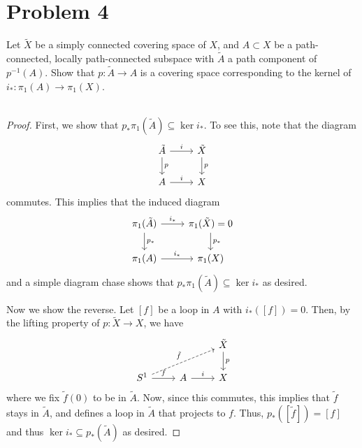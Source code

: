 \documentclass[fontsize=11pt]{scrartcl} %
\numberwithin{equation}{section} %
\numberwithin{figure}{section} %
\numberwithin{table}{section} %
\begin{document}
\section*{Problem 4}
Let $\tilde{X}$ be a simply connected covering space of $X$, and $A\subset X$ be
a path-connected, locally path-connected subspace with $\tilde{A}$ a path
component of $p^{-1}(A)$. Show that $p:\tilde{A}\to A$ is a covering space
corresponding to the kernel of $i_*:\pi_1(A)\to\pi_1(X)$.
\\
\\
\begin{proof}
    First, we show that $p_*\pi_1(\tilde{A})\subseteq \ker i_*$. To see this,
    note that the diagram
    \[
\begin{tikzcd}
    \tilde{A}\arrow{d}{p}\arrow{r}{i} &\tilde{X}\arrow{d}{p}\\
    A\arrow{r}{i} &X
\end{tikzcd}
    \]
    commutes. This implies that the induced diagram
    \[
\begin{tikzcd}
    \pi_1(\tilde{A})\arrow{d}{p_*}\arrow{r}{i_*} &\pi_1(\tilde{X})=0\arrow{d}{p_*}\\
    \pi_1(A)\arrow{r}{i_*} &\pi_1(X)
\end{tikzcd}
    \]
    and a simple diagram chase shows that $p_*\pi_1(\tilde{A})\subseteq\ker i_*$
    as desired.

    Now we show the reverse. Let $[f]$ be a loop in $A$ with $i_*([f])=0$. Then,
    by the lifting property of $p:\tilde{X}\to X$, we have
    \[
\begin{tikzcd}
    &&\tilde{X}\arrow{d}{p}\\
    S^1\arrow{r}{f}\arrow[dashed]{urr}{\tilde{f}} &A\arrow{r}{i} &X
\end{tikzcd}
    \]
    where we fix $\tilde{f}(0)$ to be in $\tilde{A}$.
    Now, since this commutes, this implies that $\tilde{f}$ stays in
    $\tilde{A}$, and defines a loop in $\tilde{A}$ that projects to $f$. Thus,
    $p_*([\tilde{f}]) = [f]$ and thus $\ker i_* \subseteq p_*(\tilde{A})$ as
    desired.
\end{proof}

\newpage
\end{document}
